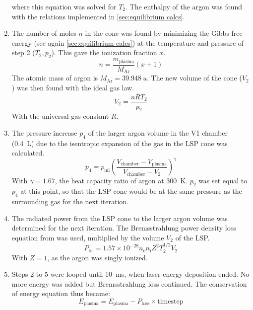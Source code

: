 \begin{enumerate}
\begin{equation}
                \end{equation}
                where this equation was solved for $T_2$. The enthalpy of the argon was found with the relations implemented in \autoref{sec:equilibrium calcs}.
            \item The number of moles $n$ in the cone was found by minimizing the Gibbs free energy (see again \autoref{sec:equilibrium calcs}) at the temperature and pressure of step 2 ($T_2, p_2$). This gave the ionization fraction $x$.
                \begin{equation}
                    n = \frac{m_\mathrm{plasma}}{M_\mathrm{Ar}}(x + 1)
                \end{equation}
                The atomic mass of argon is $M_\mathrm{Ar} = \qty{39.948}{u}$. The new volume of the cone ($V_2$) was then found with the ideal gas law.
                \begin{equation}
                    V_2 = \frac{n \bar{R} T_2}{p_2}
                \end{equation}
                With the universal gas constant $\bar{R}$.
            \item The pressure increase $p_4$ of the larger argon volume in the V1 chamber (\qty{0.4}{L}) due to the isentropic expansion of the gas in the LSP cone was calculated.
                \begin{equation}
                    p_4 = p_\mathrm{ini} \left(\frac{V_\mathrm{chamber} - V_\mathrm{plasma}}{V_\mathrm{chamber} - V_2}\right)^\gamma
                \end{equation}
                With $\gamma=1.67$, the heat capacity ratio of argon at \qty{300}{K}. $p_2$ was set equal to $p_4$ at this point, so that the LSP cone would be at the same pressure as the surrounding gas for the next iteration.
            \item The radiated power from the LSP cone to the larger argon volume was determined for the next iteration. The Bremsstrahlung power density loss equation from \textcite{glasstoneControlledThermonuclearReactions1975} was used, multiplied by the volume $V_2$ of the LSP.
                \begin{equation}
                    P_\mathrm{br} = 1.57 \times 10^{-28} n_\mathrm{e} n_\mathrm{i} Z^2 T_2^{1/2} V_2
                \end{equation}
                With $Z = 1$, as the argon was singly ionized.
            \item Steps 2 to 5 were looped until \qty{10}{ms}, when laser energy deposition ended. No more energy was added but Bremsstrahlung loss continued. The conservation of energy equation thus became:
                \begin{equation}
                    E_\mathrm{plasma} = E_\mathrm{plasma} - P_\mathrm{loss} \times \mathrm{timestep}
                \end{equation}
        \end{enumerate}
        
